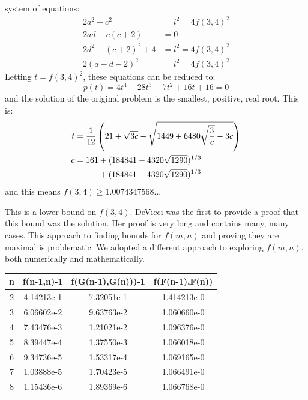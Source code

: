 \documentclass[superscriptaddress,reprint,amsmath,amssymb,aps]{revtex4-1}
\begin{document}
system of equations:
\begin{align*}
2a^2       + c^2         &= l^2 = 4 f(3,4)^2 \\
2ad        - c(c+2)      &= 0                \\
2d^2       + (c+2)^2 + 4 &= l^2 = 4 f(3,4)^2 \\
2(a-d-2)^2               &= l^2 = 4 f(3,4)^2 
\end{align*}
Letting $t = f(3,4)^2$, these equations can be reduced to:
\begin{equation*}
p(t) = 4 t^4 - 28 t^3 - 7 t^2 + 16 t + 16 = 0
\end{equation*}
and the solution of the original problem is the smallest, positive, real root.
This is:
\begin{align*}
t &= \frac{1}{12}\left
     (21 + \sqrt{3c} - \sqrt{1449 + 6480\sqrt{\frac{3}{c}} - 3c}\right) \\
c &= 161             + (184841 - 4320\sqrt{1290})^{1/3} \\
  &  \hspace{0.39in} + (184841 + 4320\sqrt{1290})^{1/3}  
\end{align*}
and this means $f(3,4) \ge 1.0074347568...$

This is a lower bound on $f(3,4)$.  DeVicci was the first to provide a proof
\cite{devicci-shultz} that this bound was the solution.  Her proof is very
long and contains many, many cases.  This approach to finding bounds for
$f(m,n)$ and proving they are maximal is problematic.  We adopted a different
approach to exploring $f(m,n)$, both numerically and mathematically.

\begin{center}
\begin{tabular}{| c | c | c | c |}
\hline
n & f(n-1,n)-1 & f(G(n-1),G(n)))-1 & f(F(n-1),F(n)) \\
\hline
2 & 4.14213e-1 & 7.32051e-1        & 1.414213e-0    \\
\hline
3 & 6.06602e-2 & 9.63763e-2        & 1.060660e-0    \\
\hline
4 & 7.43476e-3 & 1.21021e-2        & 1.096376e-0    \\
\hline
5 & 8.39447e-4 & 1.37550e-3        & 1.066018e-0    \\
\hline
6 & 9.34736e-5 & 1.53317e-4        & 1.069165e-0    \\
\hline
7 & 1.03888e-5 & 1.70423e-5        & 1.066491e-0    \\
\hline
8 & 1.15436e-6 & 1.89369e-6        & 1.066768e-0    \\
\hline
\end{tabular}
\end{center}
\end{document}
